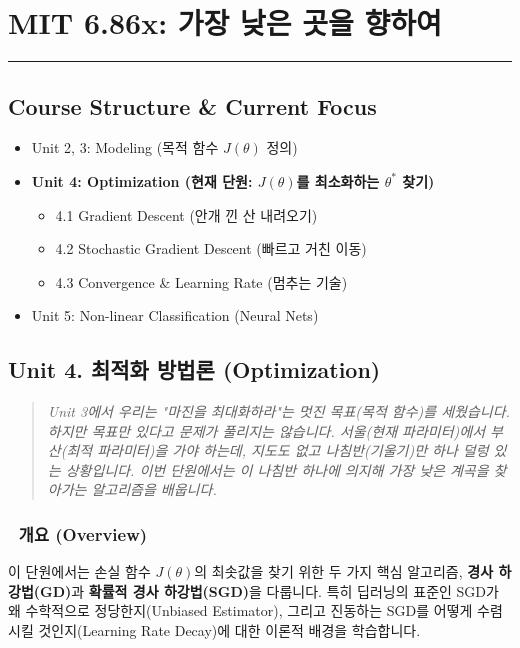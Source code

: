 \documentclass[11pt,a4paper]{book}
\theoremstyle{definition}
\begin{document}
\chapter{MIT 6.86x: 가장 낮은 곳을 향하여}
\label{ch:lecture4}


\vspace{1cm}
\hrule
\vspace{1cm}

\section*{Course Structure \& Current Focus}
\begin{itemize}
    \item Unit 2, 3: Modeling (목적 함수 $J(\theta)$ 정의)
    \item \textbf{\textcolor{mainblue}{Unit 4: Optimization (현재 단원: $J(\theta)$를 최소화하는 $\theta^*$ 찾기)}}
    \begin{itemize}
        \item 4.1 Gradient Descent (안개 낀 산 내려오기)
        \item 4.2 Stochastic Gradient Descent (빠르고 거친 이동)
        \item 4.3 Convergence \& Learning Rate (멈추는 기술)
    \end{itemize}
    \item Unit 5: Non-linear Classification (Neural Nets)
\end{itemize}


\section{Unit 4. 최적화 방법론 (Optimization)}

\begin{quote}
\textit{Unit 3에서 우리는 "마진을 최대화하라"는 멋진 목표(목적 함수)를 세웠습니다. 하지만 목표만 있다고 문제가 풀리지는 않습니다. 서울(현재 파라미터)에서 부산(최적 파라미터)을 가야 하는데, 지도도 없고 나침반(기울기)만 하나 덜렁 있는 상황입니다. 이번 단원에서는 이 나침반 하나에 의지해 가장 낮은 계곡을 찾아가는 알고리즘을 배웁니다.}
\end{quote}

\subsection*{📌 개요 (Overview)}
이 단원에서는 손실 함수 $J(\theta)$의 최솟값을 찾기 위한 두 가지 핵심 알고리즘, \textbf{경사 하강법(GD)}과 \textbf{확률적 경사 하강법(SGD)}을 다룹니다. 특히 딥러닝의 표준인 SGD가 왜 수학적으로 정당한지(Unbiased Estimator), 그리고 진동하는 SGD를 어떻게 수렴시킬 것인지(Learning Rate Decay)에 대한 이론적 배경을 학습합니다.
\end{document}

